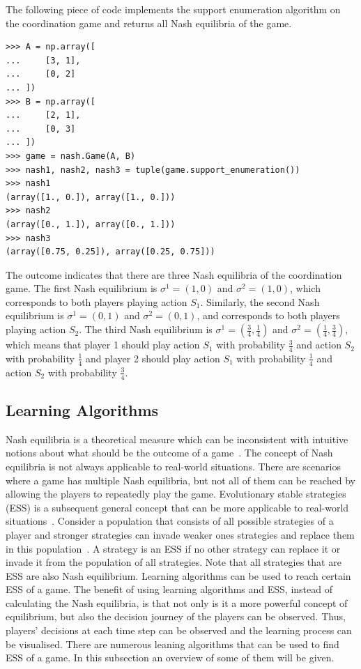The following piece of code implements the support enumeration algorithm on the
coordination game and returns all Nash equilibria of the game.

\begin{lstlisting}[style=pystyle]
>>> A = np.array([
...     [3, 1],
...     [0, 2]
... ])
>>> B = np.array([
...     [2, 1],
...     [0, 3]
... ])
>>> game = nash.Game(A, B)
>>> nash1, nash2, nash3 = tuple(game.support_enumeration())
>>> nash1
(array([1., 0.]), array([1., 0.]))
>>> nash2
(array([0., 1.]), array([0., 1.]))
>>> nash3
(array([0.75, 0.25]), array([0.25, 0.75]))

\end{lstlisting}

The outcome indicates that there are three Nash equilibria of the coordination
game.
The first Nash equilibrium is \(\sigma^1 = (1, 0)\) and \(\sigma^2 = (1, 0)\),
which corresponds to both players playing action \(S_1\).
Similarly, the second Nash equilibrium is \(\sigma^1 = (0, 1)\) and
\(\sigma^2 = (0, 1)\), and corresponds to both players playing action \(S_2\).
The third Nash equilibrium is \(\sigma^1 = (\frac{3}{4}, \frac{1}{4})\) and
\(\sigma^2 = (\frac{1}{4}, \frac{3}{4})\), which means that player 1 should
play action \(S_1\) with probability \(\frac{3}{4}\) and action \(S_2\) with
probability \(\frac{1}{4}\) and player 2 should play action \(S_1\) with
probability \(\frac{1}{4}\) and action \(S_2\) with probability
\(\frac{3}{4}\).


\subsection{Learning Algorithms}

Nash equilibria is a theoretical measure which can be inconsistent with
intuitive notions about what should be the outcome of a
game~\cite{myerson1978refinements}.
The concept of Nash equilibria is not always applicable to real-world
situations.
There are scenarios where a game has multiple Nash equilibria, but not all
of them can be reached by allowing the players to repeatedly play the game.
Evolutionary stable strategies (ESS) is a subsequent general concept that can
be more applicable to real-world situations~\cite{nowak1993evolutionary}.
Consider a population that consists of all possible strategies of a player and
stronger strategies can invade weaker ones strategies and replace them in this
population~\cite{smith1972game, smith1973logic}.
A strategy is an ESS if no other strategy can replace it or invade it from the
population of all strategies.
Note that all strategies that are ESS are also Nash equilibrium.
Learning algorithms can be used to reach certain ESS of a game.
The benefit of using learning algorithms and ESS, instead of calculating
the Nash equilibria, is that not only is it a more powerful concept of
equilibrium, but also the decision journey of the players can be observed.
Thus, players' decisions at each time step can be observed and the learning
process can be visualised.
There are numerous leaning algorithms that can be used to find ESS of a game.
In this subsection an overview of some of them will be given.

